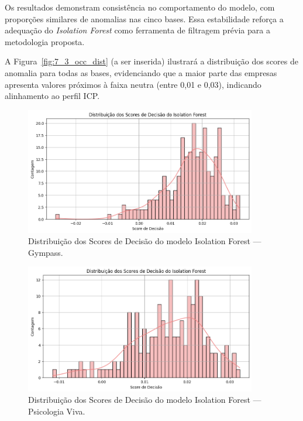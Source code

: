 Os resultados demonstram consistência no comportamento do modelo, com proporções similares de anomalias nas cinco bases. Essa estabilidade reforça a adequação do \textit{Isolation Forest} como ferramenta de filtragem prévia para a metodologia proposta.

A Figura~\ref{fig:7_3_occ_dist} (a ser inserida) ilustrará a distribuição dos scores de anomalia para todas as bases, evidenciando que a maior parte das empresas apresenta valores próximos à faixa neutra (entre 0,01 e 0,03), indicando alinhamento ao perfil ICP.

\begin{figure}[H]
    \centering
    \includegraphics[width=0.9\textwidth]{imagens/gympass_iso_forest.png}
    \caption{Distribuição dos Scores de Decisão do modelo Isolation Forest — Gympass.}
    \label{fig:gympass_iso_forest}
\end{figure}

\begin{figure}[H]
    \centering
    \includegraphics[width=0.9\textwidth]{imagens/psiviva_iso_forest.png}
    \caption{Distribuição dos Scores de Decisão do modelo Isolation Forest — Psicologia Viva.}
    \label{fig:psiviva_iso_forest}
\end{figure}

